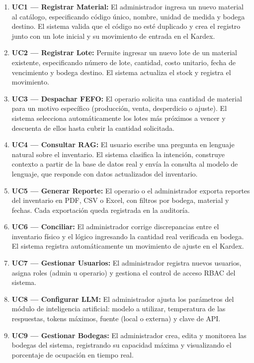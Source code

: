 \begin{enumerate}
	\item \textbf{UC1 — Registrar Material:} El administrador ingresa un nuevo material al catálogo, especificando código único, nombre, unidad de medida y bodega destino. El sistema valida que el código no esté duplicado y crea el registro junto con un lote inicial y su movimiento de entrada en el Kardex.
	\item \textbf{UC2 — Registrar Lote:} Permite ingresar un nuevo lote de un material existente, especificando número de lote, cantidad, costo unitario, fecha de vencimiento y bodega destino. El sistema actualiza el stock y registra el movimiento.
	\item \textbf{UC3 — Despachar FEFO:} El operario solicita una cantidad de material para un motivo específico (producción, venta, desperdicio o ajuste). El sistema selecciona automáticamente los lotes más próximos a vencer y descuenta de ellos hasta cubrir la cantidad solicitada.
	\item \textbf{UC4 — Consultar RAG:} El usuario escribe una pregunta en lenguaje natural sobre el inventario. El sistema clasifica la intención, construye contexto a partir de la base de datos real y envía la consulta al modelo de lenguaje, que responde con datos actualizados del inventario.
	\item \textbf{UC5 — Generar Reporte:} El operario o el administrador exporta reportes del inventario en PDF, CSV o Excel, con filtros por bodega, material y fechas. Cada exportación queda registrada en la auditoría.
	\item \textbf{UC6 — Conciliar:} El administrador corrige discrepancias entre el inventario físico y el lógico ingresando la cantidad real verificada en bodega. El sistema registra automáticamente un movimiento de ajuste en el Kardex.
	\item \textbf{UC7 — Gestionar Usuarios:} El administrador registra nuevos usuarios, asigna roles (admin u operario) y gestiona el control de acceso RBAC del sistema.
	\item \textbf{UC8 — Configurar LLM:} El administrador ajusta los parámetros del módulo de inteligencia artificial: modelo a utilizar, temperatura de las respuestas, tokens máximos, fuente (local o externa) y clave de API.
	\item \textbf{UC9 — Gestionar Bodegas:} El administrador crea, edita y monitorea las bodegas del sistema, registrando su capacidad máxima y visualizando el porcentaje de ocupación en tiempo real.
\end{enumerate}

